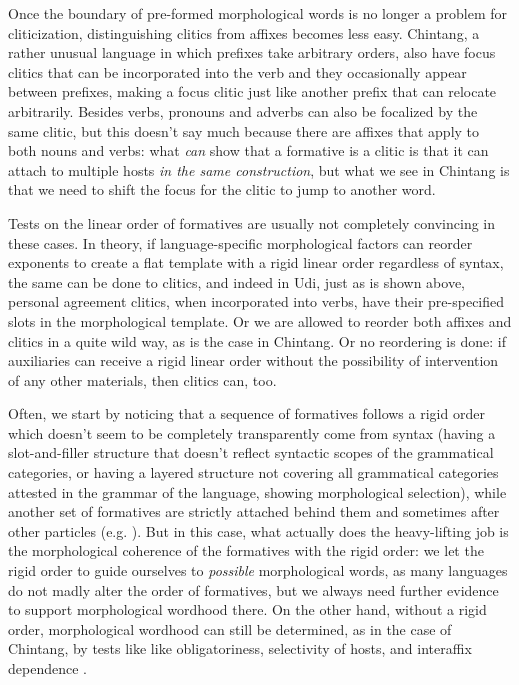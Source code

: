 \documentclass[a4paper, oneside, scheme=plain, 12pt]{article}
\newcommand*{\citesec}[1]{\S~{#1}}
\begin{document}
Once the boundary of pre-formed morphological words is no longer a problem for cliticization,
distinguishing clitics from affixes becomes less easy.
Chintang, a rather unusual language in which prefixes take arbitrary orders,
also have focus clitics that can be incorporated into the verb and
they occasionally appear between prefixes,
making a focus clitic just like another prefix that can relocate arbitrarily.
Besides verbs, pronouns and adverbs can also be focalized by the same clitic,
but this doesn't say much because there are affixes that apply to both nouns and verbs:
what \emph{can} show that a formative is a clitic is that
it can attach to multiple hosts \emph{in the same construction},
but what we see in Chintang is that we need to shift the focus 
for the clitic to jump to another word.

Tests on the linear order of formatives are usually not completely convincing in these cases.
In theory, if language-specific morphological factors can reorder exponents
to create a flat template with a rigid linear order regardless of syntax,
the same can be done to clitics,
and indeed in Udi, just as is shown above, personal agreement clitics,
when incorporated into verbs, have their pre-specified slots in the morphological template. 
Or we are allowed to reorder both affixes and clitics in a quite wild way,
as is the case in Chintang.
Or no reordering is done: if auxiliaries can receive a rigid linear order without the possibility of intervention of any other materials, then clitics can, too. 

Often, we start by noticing that a sequence of formatives follows a rigid order
which doesn't seem to be completely transparently come from syntax
(having a slot-and-filler structure that doesn't reflect syntactic scopes of the grammatical categories, or having a layered structure not covering all grammatical categories attested in the grammar of the language, showing morphological selection),
while another set of formatives are strictly attached behind them and sometimes after other particles
(e.g. \citealt[\citesec{11.6.2}]{jacques2021grammar}).
But in this case, what actually does the heavy-lifting job
is the morphological coherence of the formatives with the rigid order:
we let the rigid order to guide ourselves to \emph{possible} morphological words,
as many languages do not madly alter the order of formatives,
but we always need further evidence to support morphological wordhood there.
On the other hand, without a rigid order,
morphological wordhood can still be determined,
as in the case of Chintang, by tests like like obligatoriness, selectivity of hosts, and interaffix dependence \citep{bickel2007free}.
\end{document}
